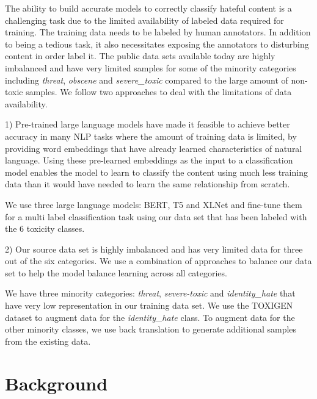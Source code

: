 \documentclass[11pt,a4paper]{article}
\begin{document}

The ability to build accurate models to correctly classify hateful content is a challenging task due to the limited availability of labeled data required for training. The training data needs to be labeled by human annotators. In addition to being a tedious task, it also necessitates exposing the annotators to  disturbing content in order label it. The public data sets available today are highly imbalanced and have very limited samples for some of the minority categories including \emph{threat}, \emph{obscene} and \emph{severe\_toxic} compared to the large amount of non-toxic samples. We follow two approaches to deal with the limitations of data availability.

1) Pre-trained large language models have made it feasible to achieve better accuracy  in many NLP tasks where the amount of training data is limited, by providing word embeddings that have already learned characteristics of natural language. Using these pre-learned embeddings as the input to a classification model enables the model to learn to classify the content using much less training data than it would have needed to learn the same relationship from scratch.

We use three large language models: BERT, T5 and XLNet and fine-tune them for a multi label classification task using our data set that has been labeled with the 6 toxicity classes. 

2) Our source data set is highly imbalanced and has very limited data for three out of the six categories. We use a combination of approaches to balance our data set to help the model balance learning across all categories.

We have three minority categories: \emph{threat}, \emph{severe-toxic} and \emph{identity\_hate} that have very low representation in our training data set. We use the TOXIGEN \cite{hartvigsen2022toxigen} dataset to augment data for the \emph{identity\_hate} class. To augment data for the other minority classes, we use back translation to generate additional samples from the existing data. 


\section{Background}
\end{document}
